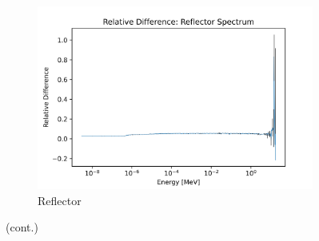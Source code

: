 \begin{figure}[H]\ContinuedFloat
\centering

\begin{subfigure}{0.95\textwidth}
  \includegraphics[width=0.95\linewidth]{figures/reldiff_reflec_spec}
  \caption{Reflector}
  \label{fig:diff-reflec}
\end{subfigure}%

\caption[]{(cont.)}
\label{fig:diff-spec}
\end{figure}